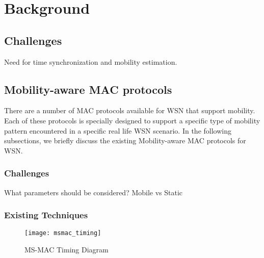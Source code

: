 
\chapter{Background} %

\label{bg} %



\section{Challenges}

Need for time synchronization and mobility estimation.

\section{Mobility-aware MAC protocols}

There are a number of MAC protocols available for WSN that support mobility. Each of these protocols is specially designed to support a specific type of mobility pattern encountered in a specific real life WSN scenario. In the following subsections, we briefly discuss the existing Mobility-aware MAC protocols for WSN.\\

\subsection{Challenges}
What parameters should be considered? Mobile vs Static

\subsection{Existing Techniques}


\begin{figure}[h]{} 
  \begin{center}
		\texttt{[image: msmac\_timing]}
		\caption{MS-MAC Timing Diagram}
	\label{fig:msmac-timing}
  \end{center}
\end{figure}



